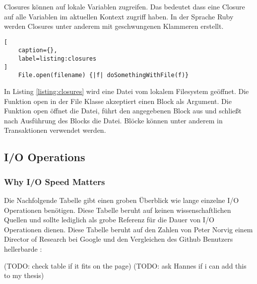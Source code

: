 Closures können auf lokale Variablen zugreifen. Das bedeutet dass eine Closure auf alle Variablen im aktuellen Kontext zugriff haben. In der Sprache Ruby werden Closures unter anderem mit geschwungenen Klammeren erstellt. \cite[]{fow04} 

\begin{lstlisting}[
	caption={},
	label=listing:closures
]
	File.open(filename) {|f| doSomethingWithFile(f)}
\end{lstlisting}
\cite[]{fow04}

In Listing \ref{listing:closures} wird eine Datei vom lokalem Filesystem geöffnet. Die Funktion open in der File Klasse akzeptiert einen Block als Argument. Die Funktion open öffnet die Datei, führt den angegebenen Block aus und schließt nach Ausführung des Blocks die Datei. Blöcke können unter anderem in Transaktionen verwendet werden. \cite[]{fow04}


\subsection{I/O Operations}





\subsubsection{Why I/O Speed Matters}
Die Nachfolgende Tabelle gibt einen groben Überblick wie lange einzelne I/O Operationen benötigen. Diese Tabelle beruht auf keinen wissenschaftlichen Quellen und sollte lediglich als grobe Referenz für die Dauer von I/O Operationen dienen. Diese Tabelle beruht auf den Zahlen von Peter Norvig \cite[]{Nor98} einem Director of Research bei Google und den Vergleichen des Github Benutzers hellerbarde \cite[]{Gis15}: 

(TODO: check table if it fits on the page)
(TODO: ask Hannes if i can add this to my thesis)

